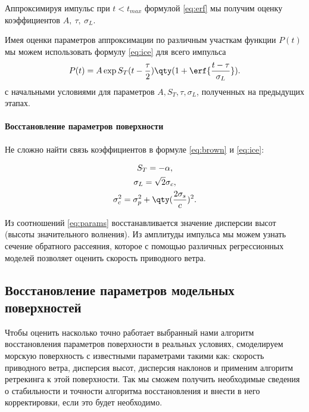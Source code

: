 Аппроксимируя импульс при $t<t_{max}$ формулой \eqref{eq:erf} мы получим оценку
коэффициентов $A,~\tau,~\sigma_L$. 


 Имея оценки параметров аппроксимации по различным
участкам функции $P(t)$ мы можем использовать формулу  \eqref{eq:ice} для всего
импульса 
\begin{equation}
    P(t) = A \exp{ S_T (t - \frac{\tau}{2})} \qty(1 + \erf{\frac{t-
    \tau}{\sigma_L}}).
\end{equation}
с начальными условиями для параметров $A, S_T, \tau, \sigma_L$, полученных на
предыдущих этапах. 







\paragraph{Восстановление параметров поверхности}%
Не сложно найти связь коэффициентов в формуле \eqref{eq:brown} и \eqref{eq:ice}:

\begin{equation}
    \label{eq:params}
    \begin{gathered}
        S_T = - \alpha,\\
        \sigma_L = \sqrt 2 \sigma_c,\\
        \sigma_c^2 = \sigma_p^2 + \qty(\frac{2\sigma_s}{c})^2.
    \end{gathered}
\end{equation}

Из соотношений \eqref{eq:params} восстанавливается значение дисперсии высот
(высоты значительного  волнения). 
Из амплитуды импульса мы можем узнать сечение обратного рассеяния, которое с
помощью различных регрессионных моделей позволяет оценить скорость приводного ветра.

\subsection{Восстановление параметров модельных поверхностей}
\label{sub:retracking_model}

Чтобы оценить насколько точно работает выбранный нами алгоритм восстановления
параметров поверхности в реальных условиях, смоделируем морскую поверхность с
известными параметрами такими как: скорость приводного ветра, дисперсия высот,
дисперсия наклонов и применим алгоритм ретрекинга к этой поверхности. Так мы
сможем получить необходимые сведения о стабильности и точности алгоритма
восстановления и внести в него корректировки, если это будет необходимо.

